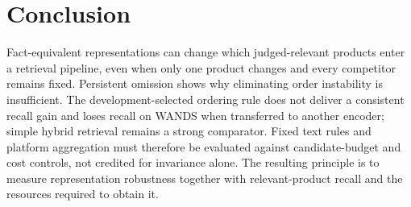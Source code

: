 \section{Conclusion}
Fact-equivalent representations can change which judged-relevant products enter a retrieval pipeline, even when only one product changes and every competitor remains fixed. Persistent omission shows why eliminating order instability is insufficient. The development-selected ordering rule does not deliver a consistent recall gain and loses recall on WANDS when transferred to another encoder; simple hybrid retrieval remains a strong comparator. Fixed text rules and platform aggregation must therefore be evaluated against candidate-budget and cost controls, not credited for invariance alone. The resulting principle is to measure representation robustness together with relevant-product recall and the resources required to obtain it.
